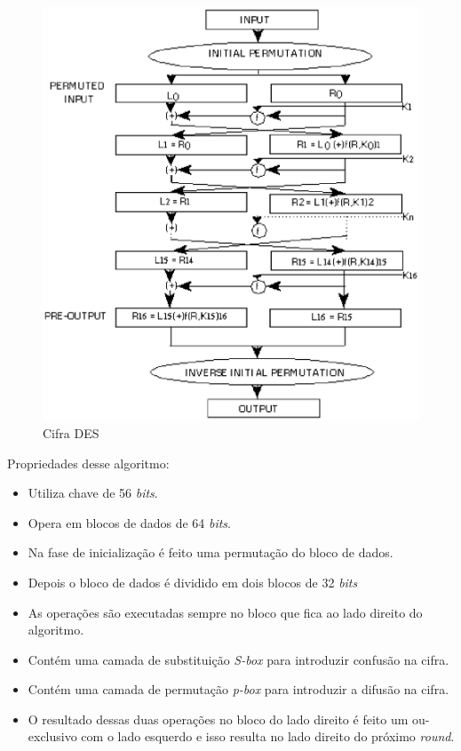\begin{figure}[h]
	\centering
	\includegraphics[scale=0.5]
		{figuras/des_cipher.eps}
		\caption[Cifra \textit{DES}]{Cifra DES\protect\footnotemark} 
\end{figure}

Propriedades desse algoritmo:

\begin{itemize}
	\item Utiliza chave de 56 \textit{bits}.
	\item Opera em blocos de dados de 64 \textit{bits}.
	\item Na fase de inicialização é feito uma permutação do bloco de dados.
	\item Depois o bloco de dados é dividido em dois blocos de 32 \textit{bits}
	\item As operações são executadas sempre no bloco que fica ao lado direito do algoritmo.
	\item Contém uma camada de substituição \textit{S-box} para introduzir confusão na cifra.
	\item Contém uma camada de permutação \textit{p-box} para introduzir a difusão na cifra.
	\item O resultado dessas duas operações no bloco do lado direito é feito um ou-exclusivo com o lado esquerdo e isso resulta no lado direito do próximo \textit{round}.
\end{itemize}

